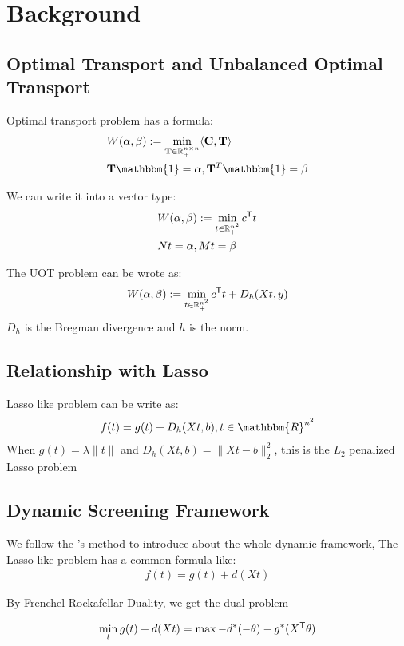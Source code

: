 \section{Background}
\subsection{Optimal Transport and Unbalanced Optimal Transport}
Optimal transport problem has a formula:
$$
\begin{aligned}
&W(\alpha,\beta) := \min_{ \mathbf{T} \in \mathbb{R}_{+}^{n \times n}} \langle \C, \mathbf{T} \rangle \\
& \mathbf{T} \mathbbm{1} = \alpha, \mathbf{T}^{T}\mathbbm{1} = \beta
\end{aligned}
$$

We can write it into a vector type:
$$
\begin{aligned}
&W(\alpha,\beta) := \min_{t \in \mathbb{R}_{+}^{n^2}} c^{\mathsf T}t \\
& Nt = \alpha, Mt = \beta
\end{aligned}
$$

The UOT problem can be wrote as: 
\begin{equation}
\label{eq:uot}
W(\alpha,\beta) := \min_{t \in \mathbb{R}_{+}^{n^2}} c^{\mathsf T}t + D_h(Xt,y)
\end{equation}
$D_h$ is the Bregman divergence and $h$ is the norm.  

\subsection{Relationship with Lasso}
Lasso like problem can be write as:
$$
\begin{aligned}
f(t) = g(t) + D_h(Xt,b), t\in \mathbbm{R}^{n^2}
\end{aligned}
$$
When $g(t) = \lambda \|t\|$ and $D_h(Xt,b) = \|Xt-b\|_2^2$, this is the $L_2$ penalized Lasso problem


\subsection{Dynamic Screening Framework}

We follow the \cite{NEURIPS2021_7b5b23f4}'s method to introduce about the whole dynamic framework, The Lasso like problem has a common formula like:
$$
\begin{aligned}
f(t) = g(t) + d(Xt)
\end{aligned}
$$

By Frenchel-Rockafellar Duality, we get the dual problem
\begin{thm}
$$
\begin{aligned}
\min_t  g(t) + d(Xt) = \max -d^*(-\theta)-g^*(X^{\mathsf T}\theta)
\end{aligned}
$$
\end{thm}

